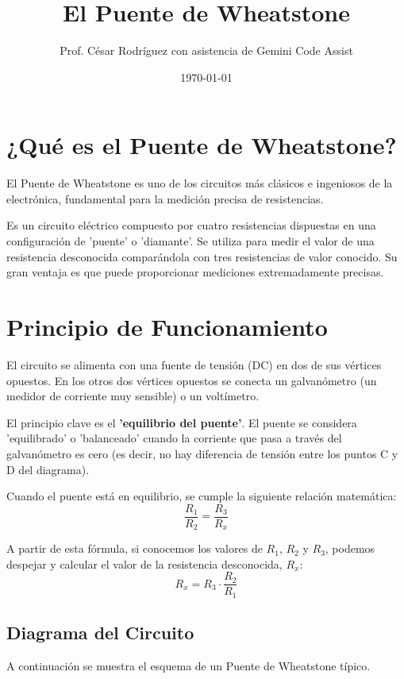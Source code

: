 \documentclass[12pt,a4paper]{article}
\title{El Puente de Wheatstone}
\author{Prof. César Rodríguez con asistencia de Gemini Code Assist}
\date{\today}
\begin{document}
\maketitle

\section{¿Qué es el Puente de Wheatstone?}

El Puente de Wheatstone es uno de los circuitos más clásicos e ingeniosos de la electrónica, fundamental para la medición precisa de resistencias.

Es un circuito eléctrico compuesto por cuatro resistencias dispuestas en una configuración de 'puente' o 'diamante'. Se utiliza para medir el valor de una resistencia desconocida comparándola con tres resistencias de valor conocido. Su gran ventaja es que puede proporcionar mediciones extremadamente precisas.

\section{Principio de Funcionamiento}

El circuito se alimenta con una fuente de tensión (DC) en dos de sus vértices opuestos. En los otros dos vértices opuestos se conecta un galvanómetro (un medidor de corriente muy sensible) o un voltímetro.

El principio clave es el \textbf{'equilibrio del puente'}. El puente se considera 'equilibrado' o 'balanceado' cuando la corriente que pasa a través del galvanómetro es cero (es decir, no hay diferencia de tensión entre los puntos C y D del diagrama).

Cuando el puente está en equilibrio, se cumple la siguiente relación matemática:
\[
\frac{R_1}{R_2} = \frac{R_3}{R_x}
\]

A partir de esta fórmula, si conocemos los valores de $R_1$, $R_2$ y $R_3$, podemos despejar y calcular el valor de la resistencia desconocida, $R_x$:
\[
R_x = R_3 \cdot \frac{R_2}{R_1}
\]

\subsection{Diagrama del Circuito}

A continuación se muestra el esquema de un Puente de Wheatstone típico.
\end{document}
